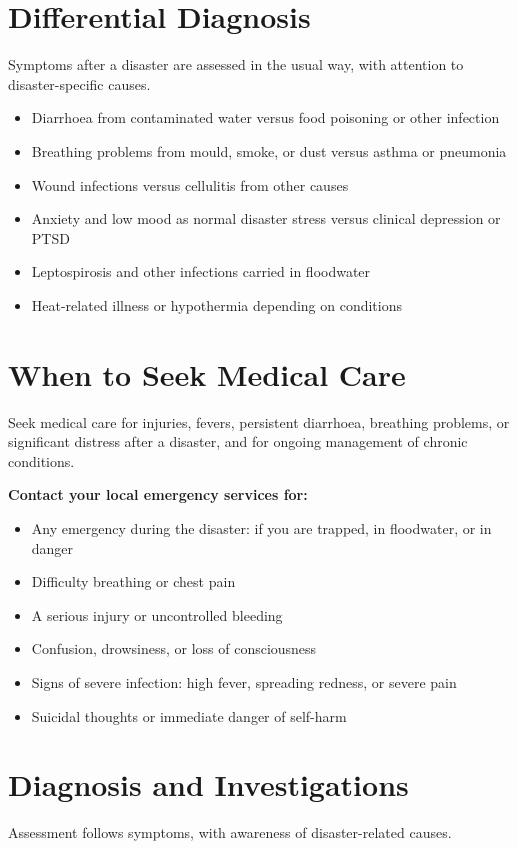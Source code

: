 \section*{Differential Diagnosis}
Symptoms after a disaster are assessed in the usual way, with attention to disaster-specific causes.

\begin{itemize}
    \item Diarrhoea from contaminated water versus food poisoning or other infection
    \item Breathing problems from mould, smoke, or dust versus asthma or pneumonia
    \item Wound infections versus cellulitis from other causes
    \item Anxiety and low mood as normal disaster stress versus clinical depression or PTSD
    \item Leptospirosis and other infections carried in floodwater
    \item Heat-related illness or hypothermia depending on conditions
\end{itemize}

\section*{When to Seek Medical Care}
Seek medical care for injuries, fevers, persistent diarrhoea, breathing problems, or significant distress after a disaster, and for ongoing management of chronic conditions.

\textbf{Contact your local emergency services for:}
\begin{itemize}
    \item Any emergency during the disaster: if you are trapped, in floodwater, or in danger
    \item Difficulty breathing or chest pain
    \item A serious injury or uncontrolled bleeding
    \item Confusion, drowsiness, or loss of consciousness
    \item Signs of severe infection: high fever, spreading redness, or severe pain
    \item Suicidal thoughts or immediate danger of self-harm
\end{itemize}

\section*{Diagnosis and Investigations}
Assessment follows symptoms, with awareness of disaster-related causes.

